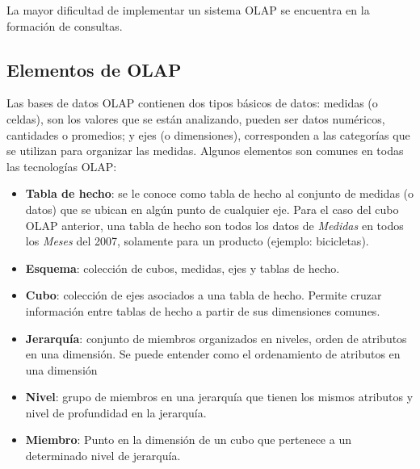 \documentclass[DIV=calc, paper=a4, fontsize=11pt, twocolumn]{scrartcl}	 %
\begin{document}
La mayor dificultad de implementar un sistema OLAP se encuentra en la formaci\'{o}n de consultas.


\subsection*{Elementos de OLAP}

Las bases de datos OLAP contienen dos tipos básicos de datos: medidas (o celdas), son los valores que se est\'{a}n analizando, pueden ser datos numéricos, cantidades o promedios; y  ejes (o dimensiones), corresponden a las categor\'{i}as que se utilizan para organizar las medidas. Algunos elementos son comunes en todas las tecnolog\'{i}as OLAP:
\begin{itemize}

\item \textbf{Tabla de hecho}: se le conoce como tabla de hecho al conjunto de medidas (o datos) que se ubican en alg\'{u}n punto de cualquier eje. Para el caso del cubo OLAP anterior, una tabla de hecho son todos los datos de \textit{Medidas} en todos los \textit{Meses} del 2007, solamente para un producto (ejemplo: bicicletas).

\item \textbf{Esquema}: colecci\'{o}n de cubos, medidas, ejes y tablas de hecho.

\item \textbf{Cubo}: colecci\'{o}n de ejes asociados a una tabla de hecho. Permite cruzar informaci\'{o}n entre tablas de hecho a partir de sus dimensiones comunes.

\item \textbf{Jerarqu\'{i}a}: conjunto de miembros organizados en niveles, orden de atributos en una dimensi\'{o}n. Se puede entender como el ordenamiento de atributos en una dimensi\'{o}n

\item \textbf{Nivel}: grupo de miembros en una jerarqu\'{i}a que tienen los mismos atributos y nivel de profundidad en la jerarqu\'{i}a.

\item \textbf{Miembro}: Punto en la dimensi\'{o}n de un cubo que pertenece a un determinado nivel de jerarqu\'{i}a.

\end{itemize}

\end{document}

